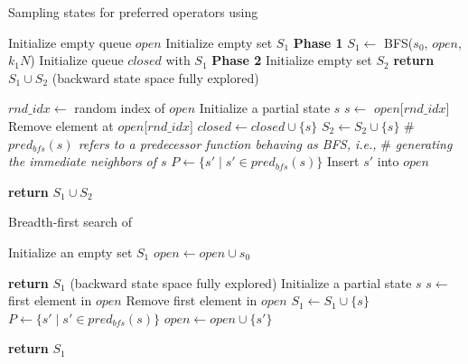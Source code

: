 \documentclass[ppgc,diss,english]{iiufrgs}
\begin{document}
\begin{algorithm}
\caption{Sampling states for preferred operators using \bfsrs}
\label{alg:sampling-po}
\begin{algorithmic}[1]
  \State Initialize empty queue $open$
  \State Initialize empty set $S_{1}$
  \State \textbf{Phase 1}
  \State $S_{1} \gets$ BFS($s_{0}$, $open$, $k_1N$)
  \State Initialize queue $closed$ with $S_{1}$
  \State \textbf{Phase 2}
  \State Initialize empty set $S_{2}$
      \State \textbf{return} $S_{1} \cup S_{2}$ (backward state space fully explored)
    \EndIf

    \State $rnd\_idx \gets$ random index of $open$
    \State Initialize a partial state $s$
    \State $s \gets$ $open$[$rnd\_idx$]
    \State Remove element at $open$[$rnd\_idx$]
    \State $closed \gets closed \cup \{s\}$
    \State $S_{2} \gets S_{2} \cup \{s\}$
    \State \# \emph{$pred_{bfs}(s)$ refers to a predecessor function behaving as BFS, i.e.,}
    \State \# \emph{generating the immediate neighbors of $s$}
    \State $P \gets \{s' \mid s' \in pred_{bfs}(s)\}$
        \State Insert $s'$ into $open$
      \EndIf
    \EndFor
  \EndWhile

  \State \textbf{return} $S_{1} \cup S_{2}$
\EndProcedure
\end{algorithmic}
\end{algorithm}

\begin{algorithm}
\caption{Breadth-first search of \bfsrs}
\label{alg:sampling-bfs}
\begin{algorithmic}[1]
  \State Initialize an empty set $S_{1}$
  \State $open \gets open \cup s_{0}$

      \State \textbf{return} $S_{1}$ (backward state space fully explored)
    \EndIf
    \State Initialize a partial state $s$
    \State $s \gets$ first element in $open$
    \State Remove first element in $open$
    \State $S_{1} \gets S_{1} \cup \{s\}$
    \State $P \gets \{s' \mid s' \in pred_{bfs}(s)\}$
        \State $open \gets open \cup \{s'\}$
      \EndIf
    \EndFor
  \EndWhile

  \State \textbf{return} $S_{1}$
\EndProcedure
\end{algorithmic}
\end{algorithm}
\end{document}
